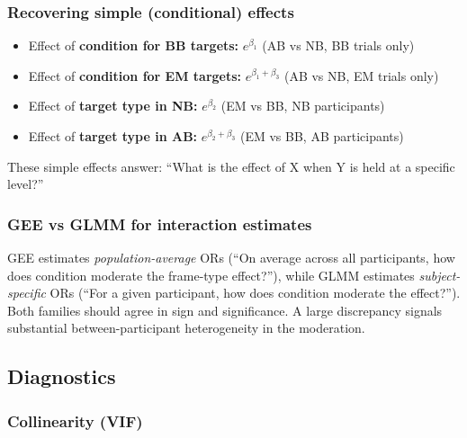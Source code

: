 \documentclass[12pt,a4paper]{article}
\begin{document}
\subsubsection{Recovering simple (conditional) effects}
\begin{itemize}[nosep]
  \item Effect of \textbf{condition for BB targets:} $e^{\beta_1}$ \hfill (AB vs NB, BB trials only)
  \item Effect of \textbf{condition for EM targets:} $e^{\beta_1 + \beta_3}$ \hfill (AB vs NB, EM trials only)
  \item Effect of \textbf{target type in NB:} $e^{\beta_2}$ \hfill (EM vs BB, NB participants)
  \item Effect of \textbf{target type in AB:} $e^{\beta_2 + \beta_3}$ \hfill (EM vs BB, AB participants)
\end{itemize}
These simple effects answer: ``What is the effect of X when Y is held at a specific level?''

\subsubsection{GEE vs GLMM for interaction estimates}
GEE estimates \emph{population-average} ORs (``On average across all participants, how does condition moderate the frame-type effect?''), while GLMM estimates \emph{subject-specific} ORs (``For a given participant, how does condition moderate the effect?''). Both families should agree in sign and significance. A large discrepancy signals substantial between-participant heterogeneity in the moderation.

\subsection{Diagnostics}

\subsubsection{Collinearity (VIF)}
\end{document}
